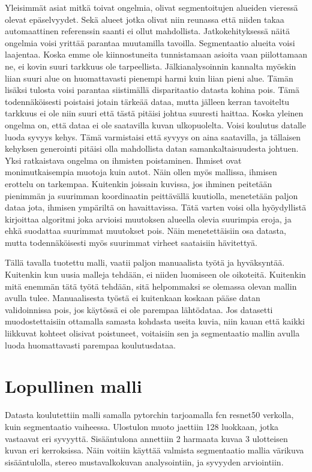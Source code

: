 Yleisimmät asiat mitkä toivat ongelmia, olivat segmentoitujen alueiden vieressä olevat epäselvyydet.
Sekä alueet jotka olivat niin reunassa että niiden takaa automaattinen referenssin saanti ei ollut mahdollista.
Jatkokehityksessä näitä ongelmia voisi yrittää parantaa muutamilla tavoilla. 
Segmentaatio alueita voisi laajentaa.
Koska emme ole kiinnostuneita tunnistamaan asioita vaan piilottamaan ne, ei kovin suuri tarkkuus ole tarpeellista.
Jälkianalysoinnin kannalta myöskin liian suuri alue on huomattavasti pienempi harmi kuin liian pieni alue. 
Tämän lisäksi tulosta voisi parantaa siistimällä disparitaatio datasta kohina pois.
Tämä todennäköisesti poistaisi jotain tärkeää dataa, mutta jälleen kerran tavoiteltu tarkkuus ei ole niin suuri että tästä pitäisi johtua suuresti haittaa.
Koska yleinen ongelma on, että dataa ei ole saatavilla kuvan ulkopuolelta. Voisi koulutus datalle luoda syvyys kehys.
Tämä varmistaisi että syvyys on aina saatavilla, ja tällaisen kehyksen generointi pitäisi olla mahdollista datan samankaltaisuudesta johtuen.
Yksi ratkaistava ongelma on ihmisten poistaminen.
Ihmiset ovat monimutkaisempia muotoja kuin autot.
Näin ollen myös mallissa, ihmisen erottelu on tarkempaa.
Kuitenkin joissain kuvissa,
jos ihminen peitetään pienimmän ja suurimman koordinaatin peittävällä kuutiolla,
menetetään paljon dataa jota, ihmisen ympäriltä on havaittavissa.
Tätä varten voisi olla hyöydyllistä kirjoittaa algoritmi joka arvioisi muutoksen alueella olevia suurimpia eroja,
ja ehkä suodattaa suurimmat muutokset pois. Näin menetettäisiin osa datasta,
mutta todennäköisesti myös suurimmat virheet saataisiin hävitettyä. 

Tällä tavalla tuotettu malli, vaatii paljon manuaalista työtä ja hyväksyntää.
Kuitenkin kun uusia malleja tehdään, ei niiden luomiseen ole oikoteitä.
Kuitenkin mitä enemmän tätä työtä tehdään,
sitä helpommaksi se olemassa olevan mallin avulla tulee.
Manuaalisesta työstä ei kuitenkaan koskaan pääse datan validoinnissa pois,
jos käytössä ei ole parempaa lähtödataa.
Jos datasetti muodostettaisiin ottamalla samasta kohdasta useita kuvia,
niin kauan että kaikki liikkuvat kohteet olisivat poistuneet,
voitaisiin sen ja segmentaatio mallin avulla luoda huomattavasti parempaa koulutusdataa. 

\section{Lopullinen malli}

Datasta koulutettiin malli samalla pytorchin tarjoamalla fcn resnet50 verkolla, kuin segmentaatio vaiheessa.
Ulostulon muoto jaettiin 128 luokkaan, jotka vastaavat eri syvyyttä.
Sisääntulona annettiin 2 harmaata kuvaa 3 ulotteisen kuvan eri kerroksissa.
Näin voitiin käyttää valmista segmentaatio mallia värikuva sisääntulolla, stereo mustavalkokuvan analysointiin, ja syvyyden arviointiin. 

